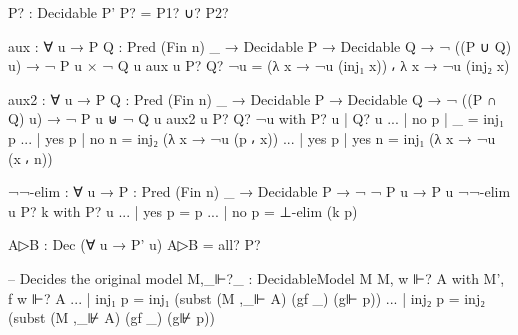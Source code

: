 \begin{spverbatim}
    P? : Decidable P'
    P? = P1? ∪? P2?

    aux : ∀ {u} → {P Q : Pred (Fin n) _} → Decidable P → Decidable Q
      →  ¬ ((P ∪ Q) u) → ¬ P u × ¬ Q u
    aux {u} P? Q? ¬u = (λ x → ¬u (inj₁ x)) ⸴ λ x → ¬u (inj₂ x)

    aux2 : ∀ {u} → {P Q : Pred (Fin n) _} → Decidable P → Decidable Q
      →  ¬ ((P ∩ Q) u) → ¬ P u ⊎ ¬ Q u
    aux2 {u} P? Q? ¬u with P? u | Q? u
    ... | no p | _ = inj₁ p
    ... | yes p | no n = inj₂ (λ x → ¬u (p ⸴ x))
    ... | yes p | yes n = inj₁ (λ x → ¬u (x ⸴ n))

    ¬¬-elim : ∀ {u} → {P : Pred (Fin n) _} → Decidable P → ¬ ¬ P u → P u
    ¬¬-elim {u} P? k with P? u
    ... | yes p = p
    ... | no p = ⊥-elim (k p)

    A▷B : Dec (∀ u → P' u)
    A▷B = all? P?

  -- Decides the original model
  M,_⊩?_ : DecidableModel M
  M, w ⊩? A with M', f w ⊩? A
  ... | inj₁ p = inj₁ (subst (M ,_⊩ A) (gf _) (g⊩ p))
  ... | inj₂ p = inj₂ (subst (M ,_⊮ A) (gf _) (g⊮ p))
\end{spverbatim}

